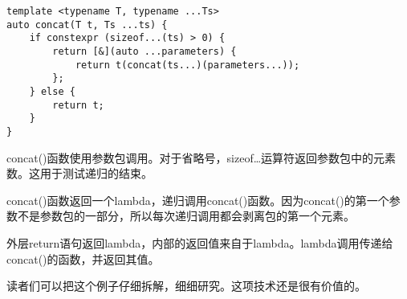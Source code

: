 \begin{lstlisting}[style=styleCXX]
template <typename T, typename ...Ts>
auto concat(T t, Ts ...ts) {
	if constexpr (sizeof...(ts) > 0) {
		return [&](auto ...parameters) {
			return t(concat(ts...)(parameters...));
		};
	} else {
		return t;
	}
}
\end{lstlisting}

concat()函数使用参数包调用。对于省略号，sizeof…运算符返回参数包中的元素数。这用于测试递归的结束。

concat()函数返回一个lambda，递归调用concat()函数。因为concat()的第一个参数不是参数包的一部分，所以每次递归调用都会剥离包的第一个元素。

外层return语句返回lambda，内部的返回值来自于lambda。lambda调用传递给concat()的函数，并返回其值。

读者们可以把这个例子仔细拆解，细细研究。这项技术还是很有价值的。





